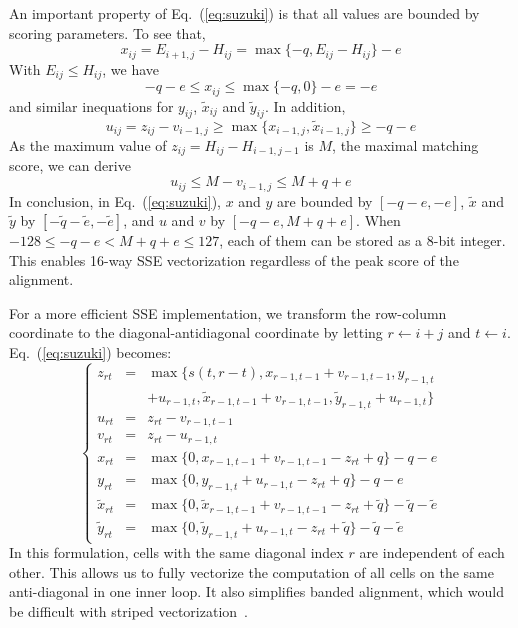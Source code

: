 \documentclass{bioinfo}
\begin{document}
\begin{methods}
An important property of Eq.~(\ref{eq:suzuki}) is that all values are bounded
by scoring parameters. To see that,
\[
x_{ij}=E_{i+1,j}-H_{ij}=\max\{-q,E_{ij}-H_{ij}\}-e
\]
With $E_{ij}\le H_{ij}$, we have
\[
-q-e\le x_{ij}\le\max\{-q,0\}-e=-e
\]
and similar inequations for $y_{ij}$, $\tilde{x}_{ij}$ and $\tilde{y}_{ij}$.
In addition,
\[
u_{ij}=z_{ij}-v_{i-1,j}\ge\max\{x_{i-1,j},\tilde{x}_{i-1,j}\}\ge-q-e
\]
As the maximum value of $z_{ij}=H_{ij}-H_{i-1,j-1}$ is $M$, the maximal
matching score, we can derive
\[
u_{ij}\le M-v_{i-1,j}\le M+q+e
\]
In conclusion, in Eq.~(\ref{eq:suzuki}), $x$ and $y$ are bounded by $[-q-e,-e]$,
$\tilde{x}$ and $\tilde{y}$ by $[-\tilde{q}-\tilde{e},-\tilde{e}]$, and $u$ and
$v$ by $[-q-e,M+q+e]$. When $-128\le-q-e<M+q+e\le127$, each of them can be stored as
a 8-bit integer. This enables 16-way SSE vectorization regardless of the peak
score of the alignment.

For a more efficient SSE implementation, we transform the row-column coordinate
to the diagonal-antidiagonal coordinate by letting $r\gets i+j$ and $t\gets i$.
Eq.~(\ref{eq:suzuki}) becomes:
\begin{equation*}
\left\{\begin{array}{lll}
z_{rt}&=&\max\{s(t,r-t),x_{r-1,t-1}+v_{r-1,t-1},y_{r-1,t}\\
&&+u_{r-1,t},\tilde{x}_{r-1,t-1}+v_{r-1,t-1},\tilde{y}_{r-1,t}+u_{r-1,t}\}\\
u_{rt}&=&z_{rt}-v_{r-1,t-1}\\
v_{rt}&=&z_{rt}-u_{r-1,t}\\
x_{rt}&=&\max\{0,x_{r-1,t-1}+v_{r-1,t-1}-z_{rt}+q\}-q-e\\
y_{rt}&=&\max\{0,y_{r-1,t}+u_{r-1,t}-z_{rt}+q\}-q-e\\
\tilde{x}_{rt}&=&\max\{0,\tilde{x}_{r-1,t-1}+v_{r-1,t-1}-z_{rt}+\tilde{q}\}-\tilde{q}-\tilde{e}\\
\tilde{y}_{rt}&=&\max\{0,\tilde{y}_{r-1,t}+u_{r-1,t}-z_{rt}+\tilde{q}\}-\tilde{q}-\tilde{e}
\end{array}\right.
\end{equation*}
In this formulation, cells with the same diagonal index $r$ are independent of
each other. This allows us to fully vectorize the computation of all cells on
the same anti-diagonal in one inner loop. It also simplifies banded alignment,
which would be difficult with striped vectorization~\citep{Farrar:2007hs}.


\end{methods}
\end{document}
